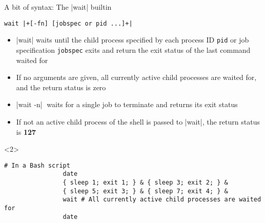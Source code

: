 \begin{frame}[fragile]{A bit of syntax: The \bash|wait| builtin}
    \vspace{-4mm}
    \begin{overlayarea}{\textwidth}{0.7\textheight}
        \begin{lstlisting}[style=MyBash, numbers=none]
            wait |+[-fn] [jobspec or pid ...]+|
        \end{lstlisting}
        \begin{itemize}
            \item \alert<3>{\bash|wait| waits until the child process specified by each process ID \texttt{pid} or job specification \texttt{jobspec} exits and return the exit status of the last command waited for}
            \item \alert<2>{If no arguments are given, all currently active child processes are waited for, and the return status is zero}
            \item \alert<4>{\bash|wait -n|$\;$ waits for a single job to terminate and returns its exit status}
            \item \alert<5>{If not an active child process of the shell is passed to \bash|wait|, the return status is \textbf{127}}
        \end{itemize}
        \vspace{-2mm}
        \begin{onlyenv}<2>
            \begin{lstlisting}[style=MyBash, numbers=none, aboveskip=3mm]
                # In a Bash script
                date
                { sleep 1; exit 1; } & { sleep 3; exit 2; } &
                { sleep 5; exit 3; } & { sleep 7; exit 4; } &
                wait # All currently active child processes are waited for
                date

\end{lstlisting}
\end{onlyenv}
\end{overlayarea}
\end{frame}
